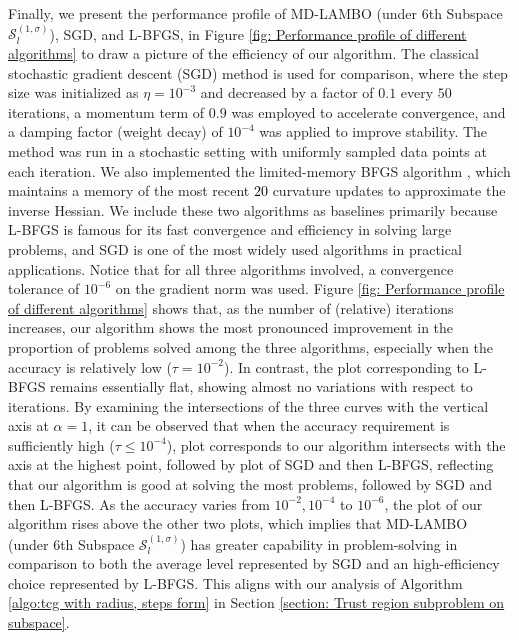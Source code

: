 \documentclass[colorlinks=true, linkcolor=blue, citecolor=blue, urlcolor=blue]{article}
\theoremstyle{plain}
\theoremstyle{definition}
\theoremstyle{remark}
\begin{document}
Finally, we present the performance profile of MD-LAMBO (under 6th Subspace $\mathcal{S}_l^{(1,\sigma)}$), SGD, and L-BFGS,  in Figure \ref{fig: Performance profile of different algorithms} to draw a picture of the efficiency of our algorithm. The classical stochastic gradient descent (SGD) method \cite{Ghadimi2013} is used for comparison, where the step size was initialized as $\eta = 10^{-3}$ and decreased by a factor of $0.1$ every $50$ iterations, a momentum term of $0.9$ was employed to accelerate convergence, 
and a damping factor (weight decay) of $10^{-4}$ was applied to improve stability. The method was run in a stochastic setting with uniformly sampled data points at each iteration. We also implemented the limited-memory BFGS algorithm \cite{Liu1989OnTL}, 
which maintains a memory of the most recent \textcolor{black}{$20$} curvature updates to approximate the inverse Hessian. We include these two algorithms as baselines primarily because L-BFGS is famous for its fast convergence and efficiency in solving large problems, and SGD is one of the most widely used algorithms in practical applications. Notice that for all three algorithms involved, a convergence tolerance of $10^{-6}$ on the gradient norm was used. Figure \ref{fig: Performance profile of different algorithms} shows that, as the number of (relative) iterations increases, our algorithm shows the most pronounced improvement in the proportion of problems solved among the three algorithms, especially when the accuracy is relatively low ($\tau=10^{-2}$). In contrast, the plot corresponding to L-BFGS remains essentially flat, showing almost no variations with respect to iterations. By examining the intersections of the three curves with the vertical axis at $\alpha=1$, it can be observed that when the accuracy requirement is sufficiently high ($\tau\leq 10^{-4}$), plot corresponds to our algorithm intersects with the axis at the highest point, followed by plot of SGD and then L-BFGS, reflecting that our algorithm is good at solving the most problems, followed by SGD and then L-BFGS. As the accuracy varies from $10^{-2},10^{-4}$ to $10^{-6}$, the plot of our algorithm rises above the other two plots, which implies that MD-LAMBO (under 6th Subspace $\mathcal{S}_l^{(1,\sigma)}$) has greater capability in problem-solving in comparison to both the average level represented by SGD and an high-efficiency choice represented by L-BFGS. This aligns with our analysis of Algorithm \ref{algo:tcg with radius, steps form} in Section \ref{section: Trust region subproblem on subspace}.
\end{document}

